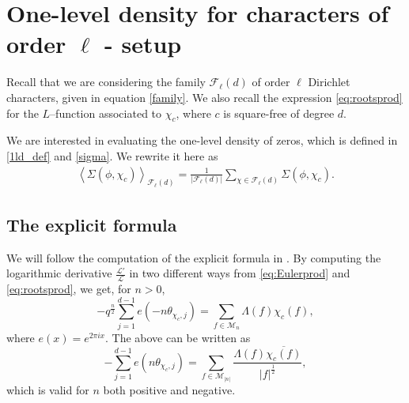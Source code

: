 \documentclass[12pt]{amsart}
\def\cL{\mathcal{L}}
\begin{document}
\section{One-level density for characters of order $\ell$ - setup}
\label{section_setup}
Recall that we are considering the family $\mathcal{F}_{\ell}(d)$ of order $\ell$ Dirichlet characters, given in equation \eqref{family}.
We also recall the expression \eqref{eq:rootsprod} for the $L$--function associated to $\chi_c$, where $c$ is square-free of degree $d$.

We are interested in evaluating the one-level density of zeros, which is defined in \eqref{1ld_def} and \eqref{sigma}. We rewrite it here as 
\begin{align} \label{OLD}
\left\langle\Sigma(\phi,\chi_c)\right\rangle_{\mathcal{F}_\ell(d)} = \frac{1}{|\mathcal{F}_\ell(d)|}\sum_{\chi \in \mathcal{F}_\ell(d)}\Sigma(\phi,\chi_c).\end{align}


\subsection{The explicit formula}We will follow the computation of the explicit formula in \cite{Bui-Florea}.
By computing the logarithmic derivative $\frac{\cL'}{\cL}$ in two different ways from \eqref{eq:Eulerprod} and \eqref{eq:rootsprod}, we get, for $n>0$, 
\[-q^\frac{n}{2} \sum_{j=1}^{d-1} e\left(-n \theta_{\chi_c,j}\right)=\sum_{f\in \mathcal{M}_n} \Lambda(f) \chi_c(f),\]
where $e(x) = e^{2 \pi i x}$.
The above can be written as 
\[-\sum_{j=1}^{d-1} e\left(n \theta_{\chi_c,j}\right)=\sum_{f\in \mathcal{M}_{|n|}} \frac{\Lambda(f) \overline{\chi_c(f)}}{|f|^\frac{1}{2}},\]
which is valid for $n$ both positive and negative. 
\end{document}
